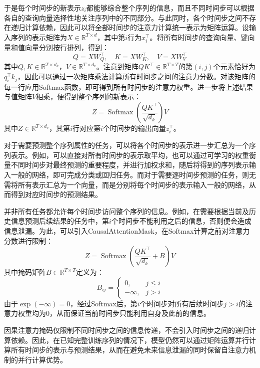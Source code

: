 于是每个时间步的新表示$z_i$都能够综合整个序列的信息，而且不同时间步可以根据各自的查询向量选择性地关注序列中的不同部分。与此同时，各个时间步之间不存在递归计算依赖，因此可以将全部时间步的注意力计算统一表示为矩阵运算。设输入序列的表示矩阵为$X\in\mathbb{R}^{T\times d}$，其中第$i$行为$x_i^\top$。将所有时间步的查询向量、键向量和值向量分别按行排列，得到：
\begin{equation*}
	Q=XW_Q^\top,\quad K=XW_K^\top,\quad V=XW_V^\top
\end{equation*}
其中$Q,K\in\mathbb{R}^{T\times d_k}$，$V\in\mathbb{R}^{T\times d_v}$。注意到矩阵$QK^\top\in\mathbb{R}^{T\times T}$的第$(i,j)$个元素恰好为$q_i^\top k_j$，因此可以通过一次矩阵乘法计算所有时间步之间的注意力分数。对该矩阵的每一行应用Softmax函数，即可得到所有时间步的注意力权重。进一步将上述结果与值矩阵$V$相乘，便得到整个序列的新表示：
\begin{equation*}
	Z=\operatorname{Softmax}\left(\frac{QK^\top}{\sqrt{d_k}}\right)V
\end{equation*}
其中$Z\in\mathbb{R}^{T\times d_v}$，其第$i$行对应第$i$个时间步的输出向量$z_i^\top$。\par
对于需要预测整个序列属性的任务，可以将各个时间步的表示进一步汇总为一个序列表示。例如，可以直接对所有时间步的表示取平均，也可以通过可学习的权重衡量不同时间步对最终预测的重要程度，并进行加权求和，随后将得到的序列表示输入一般的网络，即可完成分类或回归任务。而对于需要逐时间步预测的任务，则无需将所有表示汇总为一个向量，而是分别将每个时间步的表示输入一般的网络，从而得到对应时间步的预测结果。
\begin{note}
	并非所有任务都允许每个时间步访问整个序列的信息。例如，在需要根据当前及历史信息预测后续结果的任务中，第$i$个时间步不能利用之后的信息，否则便会造成信息泄漏。为此，可以引入\gls{CausalAttentionMask}，在Softmax计算之前对注意力分数进行限制：
	\begin{equation*}
		Z=\operatorname{Softmax}\left(\frac{QK^\top}{\sqrt{d_k}}+B\right)V
	\end{equation*}
	其中掩码矩阵$B\in\mathbb{R}^{T\times T}$定义为：
	\begin{equation*}
		B_{ij}=
		\begin{cases}
			0,&j\leq i\\
			-\infty,&j>i
		\end{cases}
	\end{equation*}
	由于$\exp(-\infty)=0$，经过Softmax后，第$i$个时间步对所有后续时间步$j>i$的注意力权重均为$0$，从而保证当前时间步只能利用自身及此前的信息。\par
	因果注意力掩码仅限制不同时间步之间的信息传递，不会引入时间步之间的递归计算依赖。因此，在已知完整训练序列的情况下，模型仍然可以通过矩阵运算并行计算所有时间步的表示与预测结果，从而在避免未来信息泄漏的同时保留自注意力机制的并行计算优势。
\end{note}
